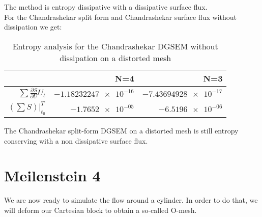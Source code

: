 \documentclass[11pt]{scrartcl}
\begin{document}
The method is entropy dissipative with a dissipative surface flux.\\
For the Chandrashekar split form and Chandrashekar surface flux without dissipation we get: \\
\begin{table}[H]
\centering
\begin{tabular}{|r|r|r|}
    \hline\hline
     & \textbf{N=4} & \textbf{N=3} \\\hline
    $\sum \frac{\partial S}{\partial U} U_t$ & $\num{-1.18232247e-16}$ & $\num{-7.43694928e-17}$ \\
    $\left( \sum S \right) |_{t_0}^{T}$ & $\num{-1.7652e-05}$ & $\num{-6.5196e-06}$ \\\hline\hline
\end{tabular}
\caption{Entropy analysis for the Chandrashekar DGSEM without dissipation on a distorted mesh}
\end{table}
The Chandrashekar split-form DGSEM  on a distorted mesh is still entropy conserving with a non dissipative surface flux. 


\newpage
\section{Meilenstein 4}
We are now ready to simulate the flow around a cylinder. In order to do that, we will deform our Cartesian block to obtain a so-called O-mesh.
\end{document}
